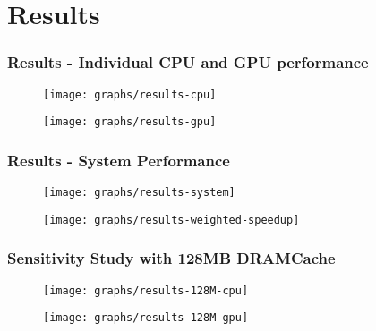 \documentclass{beamer}
\begin{document}
\section{Results}

\begin{frame}
\frametitle{Results - Individual CPU and GPU performance}
\begin{figure}
\texttt{[image: graphs/results-cpu]}
\end{figure}
\begin{figure}
\texttt{[image: graphs/results-gpu]}
\end{figure}
\end{frame}


\begin{frame}
	\frametitle{Results - System Performance}
	\begin{figure}
		\texttt{[image: graphs/results-system]}
	\end{figure}
	\begin{figure}
		\texttt{[image: graphs/results-weighted-speedup]}
	\end{figure}
\end{frame}


\begin{frame}
\frametitle{Sensitivity Study with 128MB DRAMCache}
\begin{figure}
\texttt{[image: graphs/results-128M-cpu]}
\end{figure}
\begin{figure}
	\texttt{[image: graphs/results-128M-gpu]}
\end{figure}
\end{frame}

\end{document}
